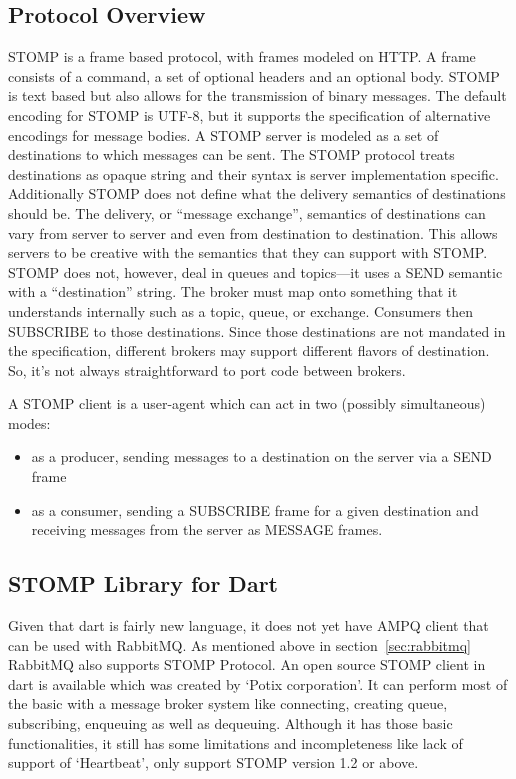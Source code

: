   \subsection{Protocol Overview}
STOMP is a frame based protocol, with frames modeled on HTTP. A frame consists of a command, a set of optional headers and an optional body. STOMP is text based but also allows for the transmission of binary messages. The default encoding for STOMP is UTF-8, but it supports the specification of alternative encodings for message bodies.
A STOMP server is modeled as a set of destinations to which messages can be sent. The STOMP protocol treats destinations as opaque string and their syntax is server implementation specific. Additionally STOMP does not define what the delivery semantics of destinations should be. The delivery, or “message exchange”, semantics of destinations can vary from server to server and even from destination to destination. This allows servers to be creative with the semantics that they can support with STOMP.
STOMP does not, however, deal in queues and topics—it uses a SEND semantic with a “destination” string. The broker must map onto something that it understands internally such as a topic, queue, or exchange. Consumers then SUBSCRIBE to those destinations. Since those destinations are not mandated in the specification, different brokers may support different flavors of destination. So, it’s not always straightforward to port code between brokers. \cite{andyPiperVmware}

A STOMP client is a user-agent which can act in two (possibly simultaneous) modes:
\begin{itemize}
  \item as a producer, sending messages to a destination on the server via a SEND frame
  \item as a consumer, sending a SUBSCRIBE frame for a given destination and receiving messages from the server as MESSAGE frames.
\end{itemize}

  \subsection{STOMP Library for Dart}
  Given that dart is fairly new language, it does not yet have AMPQ client that can be used with RabbitMQ. As mentioned above in section~\ref{sec:rabbitmq} RabbitMQ also supports STOMP Protocol. An open source STOMP client in dart is available which was created by ‘Potix corporation’. It can perform most of the basic with a message broker system like connecting, creating queue, subscribing, enqueuing as well as dequeuing. Although it has those basic functionalities, it still has some limitations and incompleteness like lack of support of ‘Heartbeat’, only support STOMP version 1.2 or above.

